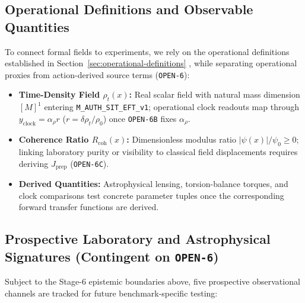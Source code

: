 \subsection{Operational Definitions and Observable Quantities}

To connect formal fields to experiments, we rely on the operational definitions established in Section~\ref{sec:operational-definitions} \label{sec:def}, while separating operational proxies from action-derived source terms (\texttt{OPEN-6}):

\begin{itemize}
    \item \textbf{Time-Density Field $\rho_t(x)$:} Real scalar field with natural mass dimension $[M]^1$ entering \texttt{M\_AUTH\_SIT\_EFT\_v1}; operational clock readouts map through $y_{\mathrm{clock}} = \alpha_\rho r$ ($r = \delta\rho_t/\rho_0$) once \texttt{OPEN-6B} fixes $\alpha_\rho$.
    \item \textbf{Coherence Ratio $R_{\mathrm{coh}}(x)$:} Dimensionless modulus ratio $|\psi(x)|/\psi_0 \ge 0$; linking laboratory purity or visibility to classical field displacements requires deriving $J_{\mathrm{prep}}$ (\texttt{OPEN-6C}).
    \item \textbf{Derived Quantities:} Astrophysical lensing, torsion-balance torques, and clock comparisons test concrete parameter tuples once the corresponding forward transfer functions are derived.
\end{itemize}

\subsection{Prospective Laboratory and Astrophysical Signatures (Contingent on \texttt{OPEN-6})}

Subject to the Stage-6 epistemic boundaries above, five prospective observational channels are tracked for future benchmark-specific testing:

